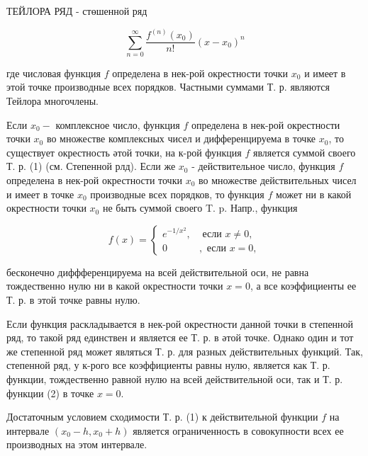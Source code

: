 \documentclass[10pt]{article}
\begin{document}
ТЕЙЛОРА РЯД - стөшенной ряд



\[

\sum_{n=0}^{\infty} \frac{f^{(n)}\left(x_{0}\right)}{n !}\left(x-x_{0}\right)^{n}

\]



где числовая функция $f$ определена в нек-рой окрестности точки $x_{0}$ и имеет в этой точке производные всех порядков. Частными суммами Т. р. являются Тейлора многочлены.



Если $x_{0}-$ комплексное число, функция $f$ определена в нек-рой окрестности точки $x_{0}$ во множестве комплексных чисел и дифференцируема в точке $x_{0}$, то существует окрестность әтой точки, на к-рой функция $f$ является суммой своего Т. р. (1) (см. Степенной рлд). Если же $x_{0}$ - действительное число, функция $f$ определена в нек-рой окрестности точки $x_{0}$ во множестве действительных чисел и имеет в точке $x_{0}$ производные всех порядков, то функция $f$ может ни в какой окрестности точки $x_{0}$ не быть суммой своего T. p. Напр., функция



\[

f(x)= \begin{cases}e^{-1 / x^{2}}, & \text { если } x \neq 0, \\ 0 & , \text { если } x=0,\end{cases}

\]



бесконечно диффференцируема на всей действительной оси, не равна тождественно нулю ни в какой окрестности точки $x=0$, а все коэффициенты ее Т. р. в этой точке равны нулю.



Если функция раскладывается в нек-рой окрестности данной точки в степенной ряд, то такой ряд единствен и является ее Т. р. в әтой точке. Однако один и тот же степенной ряд может являться Т. р. для разных действительных функций. Так, степенной ряд, у к-рого все коэффициенты равны нулю, является как Т. р. функции, тождественно равной нулю на всей действительной оси, так и Т. р. функции (2) в точке $x=0$.



Достаточным условием сходимости Т. р. (1) к действительной функции $f$ на интервале $\left(x_{0}-h, x_{0}+h\right)$ является ограниченность в совокупности всех ее производных на этом интервале.
\end{document}
